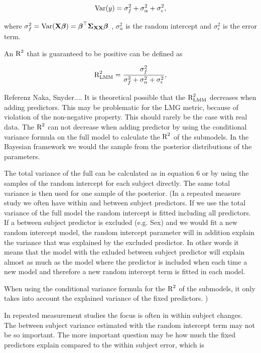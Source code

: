 \documentclass[11pt,a4paper,twoside]{book}\usepackage[]{graphicx}\usepackage[]{color}
\begin{document}
      \begin{align} 
        \operatorname{Var}(y) = \sigma_{f}^2  + \sigma_{\alpha}^2 + \sigma_{\epsilon}^2, 
        \end{align}

where $\sigma_{f}^2 = \operatorname{Var}({\mathbf{X}} {\boldsymbol{\beta}}) = {\boldsymbol{\beta}}^\top {\boldsymbol{\Sigma}}{}_{{\mathbf{X}} {\mathbf{X}}}  {\boldsymbol{\beta}}$ , $\sigma_{\alpha}^2 $ is the random intercept and $\sigma_{\epsilon}^2$ is the error term. 

An $\text{R}^2$ that is guaranteed to be positive can be defined as

   \begin{align} 
\text{R}^2_{\text{LMM}} = \frac{\sigma_{f}^2}{\sigma_{f}^2 + \sigma_{\alpha}^2 + \sigma_{\epsilon}^2},
\end{align}

Referenz Naka, Snyder.... It is theoretical possible that the $\text{R}^2_{\text{LMM}}$ decreases when adding predictors. This may be problematic for the LMG metric, because of violation of the non-negative property. This should rarely be the case with real data. The $\text{R}^2$ can not decrease when adding predictor by using the conditional variance formula on the full model to calculate the $\text{R}^2$ of the submodels. In the Bayesian framework we would the sample from the posterior distributions of the parameters. 

The total variance of the full can be calculated as in equation 6 or by using the samples of the random intercept for each subject directly. The same total variance is then used for one sample of the posterior. (In a repeated measure study we often have within and between subject predictors. If we use the total variance of the full model the random intercept is fitted including all predictors. If a between subject predictor is excluded (e.g. Sex) and we would fit a new random intercept model, the random intercept parameter will in addition explain the variance that was explained by the excluded predictor. In other words it means that the model with the exluded between subject predictor will explain almost as much as the model where the predictor is included when each time a new model and therefore a new random intercept term is fitted in each model. 

When using the conditional variance formula for the $\text{R}^2$ of the submodels, it only takes into account the explained variance of the fixed predictors. )


In repeated measurement studies the focus is often in within subject changes. The between subject variance estimated with the random intercept term may not be so important. The more important question may be how much the fixed predictors explain compared to the within subject error, which is
\end{document}
